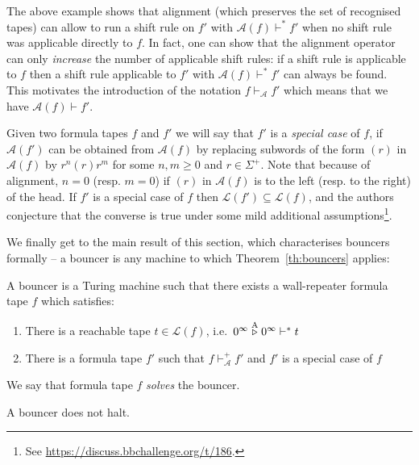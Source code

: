 The above example shows that alignment (which preserves the set of recognised tapes) can allow to run a shift rule on $f'$ with $\mathcal{A}(f) \vdash^* f'$ when no shift rule was applicable directly to $f$. In fact, one can show that the alignment operator can only \textit{increase} the number of applicable shift rules: if a shift rule is applicable to $f$ then a shift rule applicable to $f'$ with $\mathcal{A}(f) \vdash^* f'$ can always be found. This motivates the introduction of the notation $f \vdash_\mathcal{A} f'$ which means that we have $\mathcal{A}(f) \vdash f'$.

Given two formula tapes $f$ and $f'$ we will say that $f'$ is a \textit{special case} of $f$, if $\mathcal{A}(f')$ can be obtained from $\mathcal{A}(f)$ by replacing subwords of the form $(r)$ in $\mathcal{A}(f)$ by $r^n(r)r^m$ for some $n,m\geq 0$ and $r\in\Sigma^+$. Note that because of alignment, $n=0$ (resp. $m=0$) if $(r)$ in $\mathcal{A}(f)$ is to the left (resp. to the right) of the head. If $f'$ is a special case of $f$ then $\mathcal{L}(f') \subseteq \mathcal{L}(f)$, and the authors conjecture that the converse is true under some mild additional assumptions\footnote{See \url{https://discuss.bbchallenge.org/t/186}.}.

We finally get to the main result of this section, which characterises bouncers formally -- a bouncer is any machine to which Theorem~\ref{th:bouncers} applies:

\begin{definition}[Bouncers]\label{def:bouncers}
    A bouncer is a Turing machine such that there exists a wall-repeater formula tape $f$ which satisfies:
    \begin{enumerate}
        \item There is a reachable tape $t\in\mathcal{L}(f)$, i.e.\ $0^\infty \stackrel{\text{A}}\triangleright 0^\infty \vdash^* t$
        \item There is a formula tape $f'$ such that $f \vdash_\mathcal{A}^+ f'$ and $f'$ is a special case of $f$
    \end{enumerate}
    We say that formula tape $f$ \textit{solves} the bouncer.
\end{definition}

\begin{theorem}\label{th:bouncers}
    A bouncer does not halt.
\end{theorem}

